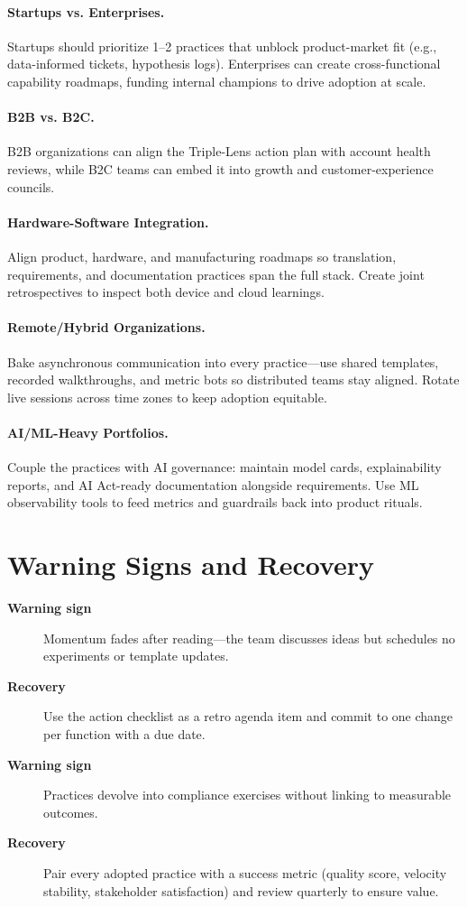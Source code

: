 \paragraph{Startups vs. Enterprises.} Startups should prioritize 1–2 practices that unblock product-market fit (e.g., data-informed tickets, hypothesis logs). Enterprises can create cross-functional capability roadmaps, funding internal champions to drive adoption at scale.

\paragraph{B2B vs. B2C.} B2B organizations can align the Triple-Lens action plan with account health reviews, while B2C teams can embed it into growth and customer-experience councils.

\paragraph{Hardware-Software Integration.} Align product, hardware, and manufacturing roadmaps so translation, requirements, and documentation practices span the full stack. Create joint retrospectives to inspect both device and cloud learnings.

\paragraph{Remote/Hybrid Organizations.} Bake asynchronous communication into every practice—use shared templates, recorded walkthroughs, and metric bots so distributed teams stay aligned. Rotate live sessions across time zones to keep adoption equitable.

\paragraph{AI/ML-Heavy Portfolios.} Couple the practices with AI governance: maintain model cards, explainability reports, and AI Act-ready documentation alongside requirements. Use ML observability tools to feed metrics and guardrails back into product rituals.

\section{Warning Signs and Recovery}
\label{sec:conclusion-warning}
\begin{description}
    \item[\textbf{Warning sign}] Momentum fades after reading—the team discusses ideas but schedules no experiments or template updates.
    \item[\textbf{Recovery}] Use the action checklist as a retro agenda item and commit to one change per function with a due date.
    \item[\textbf{Warning sign}] Practices devolve into compliance exercises without linking to measurable outcomes.
    \item[\textbf{Recovery}] Pair every adopted practice with a success metric (quality score, velocity stability, stakeholder satisfaction) and review quarterly to ensure value.
\end{description}

